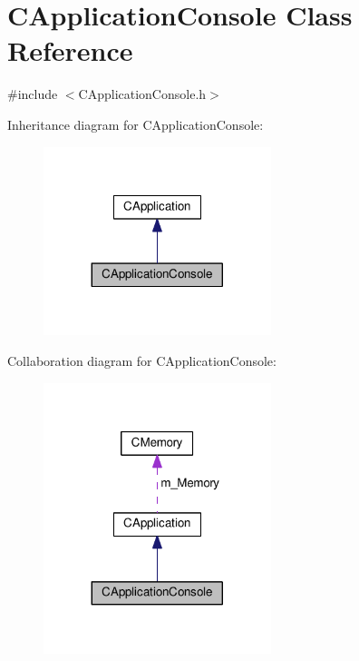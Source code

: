 \hypertarget{classCApplicationConsole}{}\section{C\+Application\+Console Class Reference}
\label{classCApplicationConsole}


{\ttfamily \#include $<$C\+Application\+Console.\+h$>$}



Inheritance diagram for C\+Application\+Console\+:\nopagebreak
\begin{figure}[H]
\begin{center}
\leavevmode
\includegraphics[width=188pt]{classCApplicationConsole__inherit__graph}
\end{center}
\end{figure}


Collaboration diagram for C\+Application\+Console\+:\nopagebreak
\begin{figure}[H]
\begin{center}
\leavevmode
\includegraphics[width=188pt]{classCApplicationConsole__coll__graph}
\end{center}
\end{figure}
